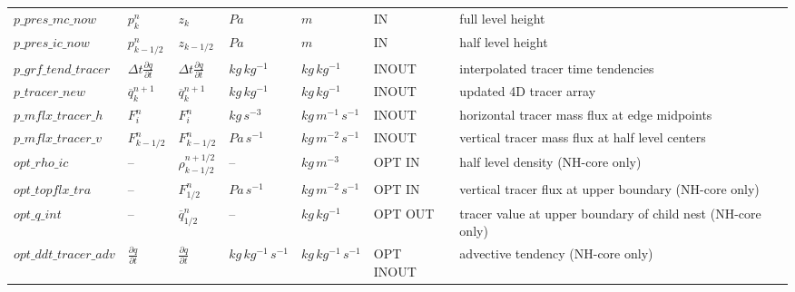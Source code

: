 \begin{landscape}
\begin{singlespacing}
\begin{longtable}{p{2.9cm}|x{2.3cm}|x{2.3cm}|x{1.9cm}|x{1.9cm}|x{2.2cm}|p{8.2cm}}
$p\_pres\_mc\_now$      &  $p^{n}_{k}$                    &  $z_{k}$                      &  $Pa$           &  $m$                  &  IN       &  full level height\\
$p\_pres\_ic\_now$      &  $p^{n}_{k-1/2}$                &  $z_{k-1/2}$                  &  $Pa$           &  $m$                  &  IN       &  half level height\\
$p\_grf\_tend\_tracer$  &  $\Delta t\frac{\partial q}{\partial t}$&  $\Delta t\frac{\partial q}{\partial t}$&  $kg\,kg^{-1}$&  $kg\,kg^{-1}$&  INOUT&  interpolated tracer time tendencies\\
$p\_tracer\_new$        &  $\overline{q}^{n+1}_{k}$       & $\overline{q}^{n+1}_{k}$      &  $kg\,kg^{-1}$  &  $kg\,kg^{-1}$        &  INOUT    &  updated 4D tracer array\\
$p\_mflx\_tracer\_h$    &  $F^{n}_{i}$                    &  $F^{n}_{i}$                  &  $kg\,s^{-3}$   &  $kg\,m^{-1}\,s^{-1}$ &  INOUT    &  horizontal tracer mass flux at edge midpoints\\
$p\_mflx\_tracer\_v$    &  $F^{n}_{k-1/2}$                &  $F^{n}_{k-1/2}$              &  $Pa\,s^{-1}$   &  $kg\,m^{-2}\,s^{-1}$ &  INOUT    &  vertical tracer mass flux at half level centers\\
$opt\_rho\_ic$          &  --                             &  $\rho_{k-1/2}^{n+1/2}$       &  --             &  $kg\,m^{-3}$         &  OPT IN   &  half level density (NH-core only)\\
$opt\_topflx\_tra$      &  --                             &  $F^{n}_{1/2}$                &  $Pa\,s^{-1}$   &  $kg\,m^{-2}\,s^{-1}$ &  OPT IN   &  vertical tracer flux at upper boundary (NH-core only)\\
$opt\_q\_int$           &  --                             &  $\overline{q}^{n}_{1/2}$     &  --             &  $kg\,kg^{-1}$        &  OPT OUT  &  tracer value at upper boundary of child nest (NH-core only)\\
$opt\_ddt\_tracer\_adv$ &  $\frac{\partial q}{\partial t}$&  $\frac{\partial q}{\partial t}$ &  $kg\,kg^{-1}\,s^{-1}$&  $kg\,kg^{-1}\,s^{-1}$& OPT INOUT&  advective tendency (NH-core only)\\
\end{longtable}
\endgroup

\end{singlespacing}

\end{landscape}
\normalsize 



